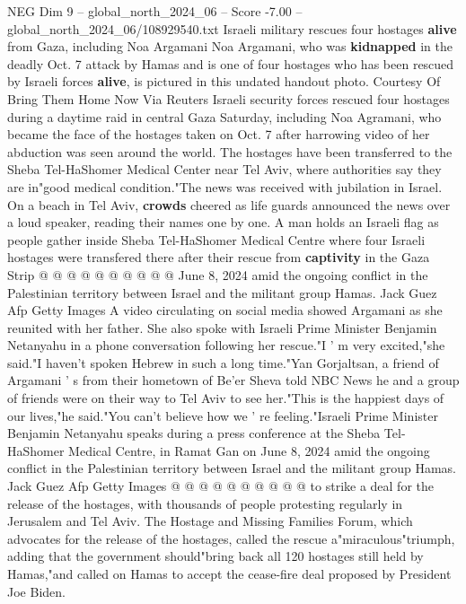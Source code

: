 \begin{textsample}{NEG Dim 9 – global\_north\_2024\_06 – Score -7.00 – global\_north\_2024\_06/108929540.txt}  \label{ex:f9_neg_168}
Israeli military rescues four hostages \textbf{alive} from Gaza, including Noa Argamani Noa Argamani, who was \textbf{kidnapped} in the deadly Oct. 7 attack by Hamas and is one of four hostages who has been rescued by Israeli forces \textbf{alive}, is pictured in this undated handout photo.
Courtesy Of Bring Them Home Now Via Reuters Israeli security forces rescued four hostages during a daytime raid in central Gaza Saturday, including Noa Agramani, who became the face of the hostages taken on Oct. 7 after harrowing video of her abduction was seen around the world.
The hostages have been transferred to the Sheba Tel-HaShomer Medical Center near Tel Aviv, where authorities say they are in"good medical condition."The news was received with jubilation in Israel.
On a beach in Tel Aviv, \textbf{crowds} cheered as life guards announced the news over a loud speaker, reading their names one by one.
A man holds an Israeli flag as people gather inside Sheba Tel-HaShomer Medical Centre where four Israeli hostages were transfered there after their rescue from \textbf{captivity} in the Gaza Strip @ @ @ @ @ @ @ @ @ @ June 8, 2024 amid the ongoing conflict in the Palestinian territory between Israel and the militant group Hamas.
Jack Guez Afp Getty Images A video circulating on social media showed Argamani as she reunited with her father.
She also spoke with Israeli Prime Minister Benjamin Netanyahu in a phone conversation following her rescue."I ' m very excited,"she said."I haven't spoken Hebrew in such a long time."Yan Gorjaltsan, a friend of Argamani ' s from their hometown of Be'er Sheva told NBC News he and a group of friends were on their way to Tel Aviv to see her."This is the happiest days of our lives,"he said."You can't believe how we ' re feeling."Israeli Prime Minister Benjamin Netanyahu speaks during a press conference at the Sheba Tel-HaShomer Medical Centre, in Ramat Gan on June 8, 2024 amid the ongoing conflict in the Palestinian territory between Israel and the militant group Hamas.
Jack Guez Afp Getty Images @ @ @ @ @ @ @ @ @ @ to strike a deal for the release of the hostages, with thousands of people protesting regularly in Jerusalem and Tel Aviv.
The Hostage and Missing Families Forum, which advocates for the release of the hostages, called the rescue a"miraculous"triumph, adding that the government should"bring back all 120 hostages still held by Hamas,"and called on Hamas to accept the cease-fire deal proposed by President Joe Biden.

\end{textsample}
